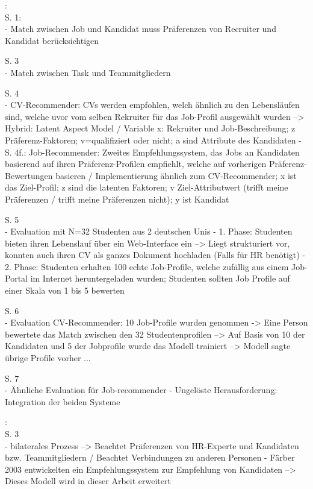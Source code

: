 \textcite{malinowski:2006}:\\
S. 1:\\
- Match zwischen Job und Kandidat muss Präferenzen von Recruiter und Kandidat berücksichtigen

S. 3\\
- Match zwischen Task und Teammitgliedern

S. 4\\
- CV-Recommender: CVs werden empfohlen, welch ähnlich zu den Lebensläufen sind, welche uvor vom selben Rekruiter für das Job-Profil ausgewählt wurden --> Hybrid: Latent Aspect Model / Variable x: Rekruiter und Job-Beschreibung; z Präferenz-Faktoren; v=qualifiziert oder nicht; a sind Attribute des Kandidaten
- S. 4f.: Job-Recommender: Zweites Empfehlungssystem, das Jobs an Kandidaten basierend auf ihren Präferenz-Profilen empfiehlt, welche auf vorherigen Präferenz-Bewertungen basieren / Implementierung ähnlich zum CV-Recommender; x ist das Ziel-Profil; z sind die latenten Faktoren; v Ziel-Attributwert (trifft meine Präferenzen / trifft meine Präferenzen nicht); y ist Kandidat

S. 5\\
- Evaluation mit N=32 Studenten aus 2 deutschen Unis
- 1. Phase: Studenten bieten ihren Lebenslauf über ein Web-Interface ein --> Liegt strukturiert vor, konnten auch ihren CV als ganzes Dokument hochladen (Falls für HR benötigt)
- 2. Phase: Studenten erhalten 100 echte Job-Profile, welche zufällig aus einem Job-Portal im Internet heruntergeladen wurden; Studenten sollten Job Profile auf einer Skala von 1 bis 5 bewerten

S. 6\\
- Evaluation CV-Recommender: 10 Job-Profile wurden genommen -> Eine Person bewertete das Match zwischen den 32 Studentenprofilen --> Auf Basis von 10 der Kandidaten und 5 der Jobprofile wurde das Modell trainiert --> Modell sagte übrige Profile vorher ...

S. 7\\
- Ähnliche Evaluation für Job-recommender
- Ungelöste Herausforderung: Integration der beiden Systeme

\textcite{malinowski:2005}:\\
S. 3\\
- bilaterales Prozess --> Beachtet Präferenzen von HR-Experte und Kandidaten bzw. Teammitgliedern / Beachtet Verbindungen zu anderen Personen
- Färber 2003 entwickelten ein Empfehlungssystem zur Empfehlung von Kandidaten --> Dieses Modell wird in dieser Arbeit erweitert

